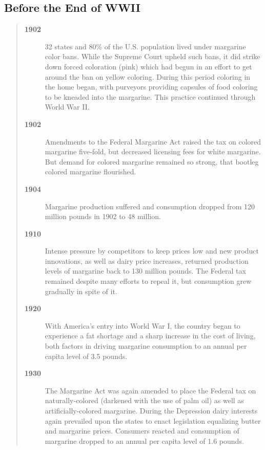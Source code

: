 \documentclass[stsc,blindrev]{informs-stsc}
\begin{document}
\subsection{Before the End of WWII}

\begin{quotation}

\begin{description}

\item[\bf 1902] 32 states and 80\% of the U.S. population lived under
margarine color bans. While the Supreme Court upheld such bans, it
did strike down forced coloration (pink) which had begun in an
effort to get around the ban on yellow coloring. During this period
coloring in the home began, with purveyors providing capsules of
food coloring to be kneaded into the margarine. This practice
continued through World War II.

\item[\bf 1902] Amendments to the Federal Margarine Act raised the tax
on colored margarine five-fold, but decreased licensing fees for
white margarine. But demand for colored margarine remained so
strong, that bootleg colored margarine flourished.

\item[\bf 1904] Margarine production suffered and consumption dropped
from 120 million pounds in 1902 to 48 million.

\item[\bf 1910] Intense pressure by competitors to keep prices low and
new product innovations, as well as dairy price increases, returned
production levels of margarine back to 130 million pounds. The
Federal tax remained despite many efforts to repeal it, but
consumption grew gradually in spite of it.

\item[\bf 1920] With America's entry into World War I, the country began
to experience a fat shortage and a sharp increase in the cost of
living,  both factors in driving margarine consumption to an annual
per capita level of 3.5 pounds.

\item[\bf 1930] The Margarine Act was again amended to place the Federal
tax on naturally-colored (darkened with the use of palm oil) as well
as artificially-colored margarine. During the Depression dairy
interests again prevailed upon the states to enact legislation
equalizing butter and margarine prices. Consumers reacted and
consumption of margarine dropped to an annual per capita level of
1.6 pounds.


\end{description}
\end{quotation}
\end{document}
